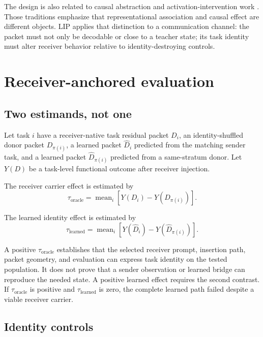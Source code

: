 \documentclass[11pt]{article}
\begin{document}
The design is also related to causal abstraction and activation-intervention work \cite{geiger2021,zhang2023}. Those traditions emphasize that representational association and causal effect are different objects. LIP applies that distinction to a communication channel: the packet must not only be decodable or close to a teacher state; its task identity must alter receiver behavior relative to identity-destroying controls.

\section{Receiver-anchored evaluation}

\subsection{Two estimands, not one}

Let task \(i\) have a receiver-native task residual packet \(D_i\), an identity-shuffled donor packet \(D_{\pi(i)}\), a learned packet \(\widehat{D}_i\) predicted from the matching sender task, and a learned packet \(\widehat{D}_{\pi(i)}\) predicted from a same-stratum donor. Let \(Y(D)\) be a task-level functional outcome after receiver injection.

The receiver carrier effect is estimated by
\begin{equation}
\tau_{\mathrm{oracle}} = \operatorname{mean}_i\left[Y(D_i)-Y(D_{\pi(i)})\right].
\end{equation}

The learned identity effect is estimated by
\begin{equation}
\tau_{\mathrm{learned}} = \operatorname{mean}_i\left[Y(\widehat{D}_i)-Y(\widehat{D}_{\pi(i)})\right].
\end{equation}

A positive \(\tau_{\mathrm{oracle}}\) establishes that the selected receiver prompt, insertion path, packet geometry, and evaluation can express task identity on the tested population. It does not prove that a sender observation or learned bridge can reproduce the needed state. A positive learned effect requires the second contrast. If \(\tau_{\mathrm{oracle}}\) is positive and \(\tau_{\mathrm{learned}}\) is zero, the complete learned path failed despite a viable receiver carrier.

\subsection{Identity controls}
\end{document}
